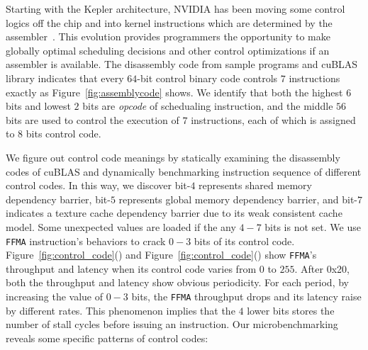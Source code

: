 Starting with the Kepler architecture, NVIDIA has been moving some control logics off the chip and into kernel
instructions which are determined by the assembler~\cite{lai,maxas}. This evolution provides programmers the opportunity to
make globally optimal scheduling decisions and other control optimizations if an assembler is available. The disassembly
code from sample programs and cuBLAS library indicates that every $64$-bit control binary code controls $7$ instructions
exactly as Figure~\ref{fig:assemblycode} shows.
We identify that both the highest $6$ bits and lowest
$2$ bits are {\em opcode} of schedualing instruction, and the middle $56$ bits are used to control the execution of $7$
instructions, each of which is assigned to $8$ bits control code.

We figure out control code meanings by statically examining the disassembly codes of cuBLAS and
dynamically benchmarking instruction sequence of different control codes.
In this way, we discover bit-$4$ represents shared memory dependency barrier, bit-$5$ represents global memory dependency
barrier, and bit-$7$ indicates a texture cache dependency barrier due to its weak consistent cache model.
Some unexpected values are loaded if the any $4-7$ bits is not set.
We use {\tt FFMA} instruction's behaviors to crack $0-3$ bits of its control code.
Figure~\ref{fig:control_code}() and
Figure~\ref{fig:control_code}() show {\tt FFMA}'s throughput and latency when its control
code varies from $0$ to $255$.
After 0x20, both the throughput and latency show obvious periodicity.
For each period, by increasing the value of $0-3$ bits, the {\tt FFMA} throughput drops and its latency raise by different rates. 
This phenomenon implies that the $4$ lower bits stores the number of stall cycles before issuing
an instruction.
Our microbenchmarking reveals some specific patterns of control codes:

